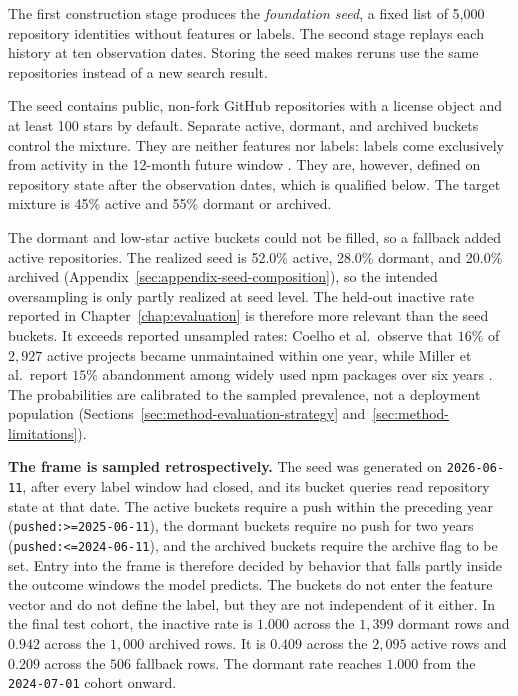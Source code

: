 The first construction stage produces the \emph{foundation seed}, a fixed list
of 5{,}000 repository identities without features or labels. The second stage
replays each history at ten observation dates. Storing the seed makes reruns use
the same repositories instead of a new search result.

The seed contains public, non-fork GitHub repositories with a license object and
at least 100 stars by default. Separate active, dormant, and archived buckets
control the mixture. They are neither features nor labels: labels come
exclusively from activity in the 12-month future window
\cite{ossRiskRadarDatasetBuilder}. They are, however, defined on repository state
after the observation dates, which is qualified below. The target mixture is
45\% active and 55\% dormant or archived.

The dormant and low-star active buckets could not be filled, so a fallback added
active repositories. The realized seed is 52.0\% active, 28.0\% dormant, and
20.0\% archived (Appendix~\ref{sec:appendix-seed-composition}), so the intended
oversampling is only partly realized at seed level. The held-out inactive rate
reported in Chapter~\ref{chap:evaluation} is therefore more relevant than the
seed buckets. It exceeds
reported unsampled rates: Coelho et al.\ observe that \(16\%\) of \(2{,}927\)
active projects became unmaintained within one year, while Miller et al.\ report
\(15\%\) abandonment among widely used npm packages over six years
\cite{coelho2020maintained,miller2025abandonment}. The probabilities are
calibrated to the sampled prevalence, not a deployment population
(Sections~\ref{sec:method-evaluation-strategy} and~\ref{sec:method-limitations}).

\label{sec:method-retrospective-frame}
\textbf{The frame is sampled retrospectively.} The seed was generated on
\texttt{2026-06-11}, after every label window had closed, and its bucket queries
read repository state at that date. The active buckets require a push within the
preceding year (\texttt{pushed:>=2025-06-11}), the dormant buckets require no
push for two years (\texttt{pushed:<=2024-06-11}), and the archived buckets
require the archive flag to be set. Entry into the frame is therefore decided by
behavior that falls partly inside the outcome windows the model predicts. The
buckets do not enter the feature vector and do not define the label, but they are
not independent of it either. In the final test cohort, the inactive rate is
\(1.000\) across the \(1{,}399\) dormant rows and \(0.942\) across the
\(1{,}000\) archived rows. It is \(0.409\) across the \(2{,}095\) active rows
and \(0.209\) across the \(506\) fallback rows. The dormant rate reaches
\(1.000\) from the \texttt{2024-07-01} cohort onward.

